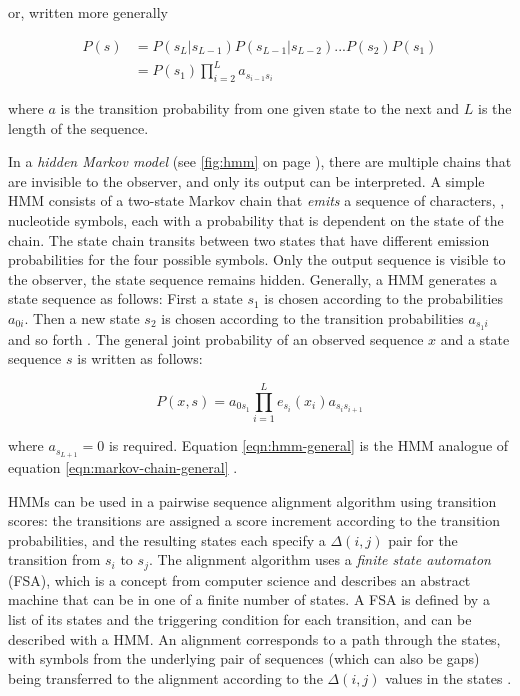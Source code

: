 or, written more generally

\begin{equation}
	\begin{split}
		P(s) &= P(s_L|s_{L-1}) P(s_{L-1}|s_{L-2}) . . . P(s_2) P(s_1) \\
		&= P(s_1) \prod^{L}_{i=2}a_{s_{i-1}s_{i}}
	\end{split}
	\label{eqn:markov-chain-general}
\end{equation}

where $a$ is the transition probability from one given state to the next and $L$
is the length of the sequence.

In a \emph{hidden Markov model} (see \autoref{fig:hmm} on page \pageref{fig:hmm}), there are multiple chains that are invisible to
the observer, and only its output can be interpreted. A simple HMM consists of a
two-state Markov chain that \emph{emits} a sequence of characters, \eg, nucleotide
symbols, each with a probability that is dependent on the state of the chain. The state chain
transits between two states that have different emission probabilities for the
four possible symbols. Only the output sequence is visible to the observer, the
state sequence remains hidden.
Generally, a HMM generates a state sequence as follows: First a state $s_1$ is
chosen according to the probabilities $a_{0i}$. Then a new state $s_2$ is
chosen according to the transition probabilities $a_{s_{1}i}$ and so forth
\citep{durbin1998}. The general joint probability of an observed sequence $x$
and a state sequence $s$ is written as follows:

\begin{equation}
P(x,s) = a_{0s_1} \prod_{i=1}^L e_{s_i}(x_i)a_{s_is_{i+1}}
\label{eqn:hmm-general}
\end{equation}

where $a_{s_{L+1}} = 0$ is required. Equation \eqref{eqn:hmm-general} is the HMM
analogue of equation \eqref{eqn:markov-chain-general} \citep{durbin1998}.



\clearpage

HMMs can be used in a pairwise sequence alignment algorithm using transition
scores: the transitions are assigned a score increment according to the
transition probabilities, and the resulting states each specify a $\Delta(i,j)$
pair for the transition from $s_i$ to $s_j$. The alignment algorithm uses a
\emph{finite state automaton} (FSA), which is a concept from computer science
and describes an abstract machine that can be in one of a finite number of
states. A FSA is defined by a list of its states and the triggering condition
for each transition, and can be described with a HMM. An alignment corresponds
to a path through the states, with symbols from the underlying pair of
sequences (which can also be gaps) being transferred to the alignment according
to the $\Delta(i,j)$ values in the states \citep{durbin1998}. 

